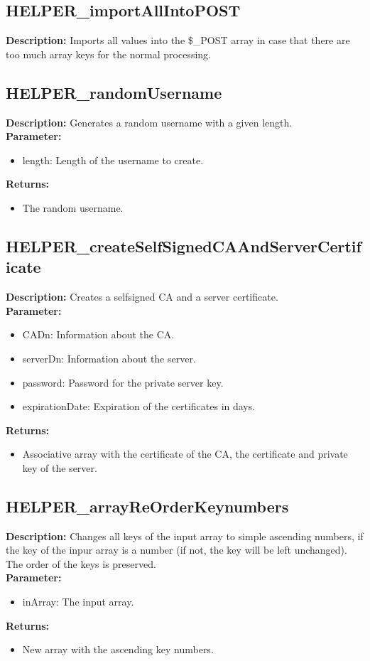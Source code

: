 \subsection{HELPER\_importAllIntoPOST}
\textbf{Description:} Imports all values into the \$\_POST array in case that there are too much array keys for the normal processing.\\

\subsection{HELPER\_randomUsername}
\textbf{Description:} Generates a random username with a given length.\\
\textbf{Parameter:}
\begin{itemize}
\item length: Length of the username to create.
\end{itemize}
\textbf{Returns:}
\begin{itemize}
\item The random username.
\end{itemize}

\subsection{HELPER\_createSelfSignedCAAndServerCertificate}
\textbf{Description:} Creates a selfsigned CA and a server certificate.\\
\textbf{Parameter:}
\begin{itemize}
\item CADn: Information about the CA.
\item serverDn: Information about the server.
\item password: Password for the private server key.
\item expirationDate: Expiration of the certificates in days.
\end{itemize}
\textbf{Returns:}
\begin{itemize}
\item Associative array with the certificate of the CA, the certificate and private key of the server.
\end{itemize}

\subsection{HELPER\_arrayReOrderKeynumbers}
\textbf{Description:} Changes all keys of the input array to simple ascending numbers, if the key of the inpur array is a number (if not, the key will be left unchanged). The order of the keys is preserved.\\
\textbf{Parameter:}
\begin{itemize}
\item inArray: The input array.
\end{itemize}
\textbf{Returns:}
\begin{itemize}
\item New array with the ascending key numbers.
\end{itemize}

